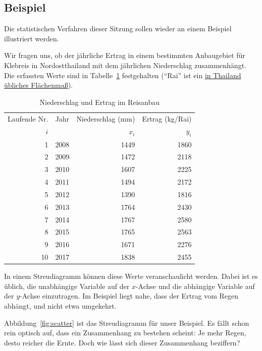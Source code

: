 \documentclass[
  11pt,
  ngerman,
  a4paper,
]{report}
\begin{document}
\hypertarget{beispiel-23}{%
\subsection{Beispiel}\label{beispiel-23}}

Die statistischen Verfahren dieser Sitzung sollen wieder an einem Beispiel illustriert werden.

Wir fragen uns, ob der jährliche Ertrag in einem bestimmten Anbaugebiet für Klebreis in Nordostthailand mit dem jährlichen Niederschlag zusammenhängt. Die erfassten Werte sind in Tabelle~\ref{tab:reis} festgehalten (\enquote{Rai} ist ein \href{https://de.wikipedia.org/wiki/Rai_(Einheit)}{in Thailand übliches Flächenmaß}).

\begin{table}

\caption{\label{tab:reis}\label{tab:reis}Niederschlag und Ertrag im Reisanbau}
\centering
\begin{tabular}[t]{rrrr}
\toprule
\multicolumn{1}{c}{Laufende Nr.} & \multicolumn{1}{c}{Jahr} & \multicolumn{1}{c}{Niederschlag (mm)} & \multicolumn{1}{c}{Ertrag (kg/Rai)} \\
\cmidrule(l{3pt}r{3pt}){1-1} \cmidrule(l{3pt}r{3pt}){2-2} \cmidrule(l{3pt}r{3pt}){3-3} \cmidrule(l{3pt}r{3pt}){4-4}
$i$ &  & $x_i$ & $y_i$\\
\midrule
1 & 2008 & 1449 & 1860\\
2 & 2009 & 1472 & 2118\\
3 & 2010 & 1607 & 2225\\
4 & 2011 & 1494 & 2172\\
5 & 2012 & 1390 & 1816\\
6 & 2013 & 1764 & 2430\\
7 & 2014 & 1767 & 2580\\
8 & 2015 & 1765 & 2563\\
9 & 2016 & 1671 & 2276\\
10 & 2017 & 1838 & 2455\\
\bottomrule
\end{tabular}
\end{table}

In einem Streudiagramm können diese Werte veranschaulicht werden. Dabei ist es üblich, die unabhängige Variable auf der \(x\)-Achse und die abhängige Variable auf der \(y\)-Achse einzutragen. Im Beispiel liegt nahe, dass der Ertrag vom Regen abhängt, und nicht etwa umgekehrt.

Abbildung~\ref{fig:scatter} ist das Streudiagramm für unser Beispiel. Es fällt schon rein optisch auf, dass ein Zusammenhang zu bestehen scheint: Je mehr Regen, desto reicher die Ernte. Doch wie lässt sich dieser Zusammenhang beziffern?
\end{document}

